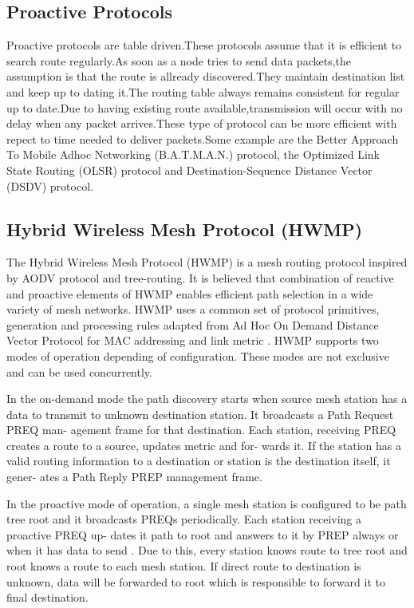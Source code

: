 \documentclass[12pt,a4paper]{report}
\begin{document}
\subsection{Proactive Protocols}
Proactive protocols are table driven.These protocols assume that it is efficient to search route regularly.As soon as a node tries to send data packets,the assumption is that the route is allready discovered.They maintain destination list and keep up to dating it.The routing table always remains consistent for regular up to date.Due to having existing route available,transmission will occur with no delay when any packet arrives.These type of protocol can be more efficient with repect to time needed to deliver packets.Some example are   the Better Approach To Mobile Adhoc Networking (B.A.T.M.A.N.) protocol, the Optimized Link State Routing (OLSR) protocol and Destination-Sequence Distance Vector (DSDV) protocol.


\subsection{Hybrid Wireless Mesh Protocol (HWMP) }
The Hybrid Wireless Mesh Protocol (HWMP) is a mesh
routing protocol inspired by AODV protocol and tree-routing. It is
believed that  combination of reactive and
proactive elements of HWMP enables efficient path selection
in a wide variety of mesh networks. HWMP uses a common
set of protocol primitives, generation and processing rules
adapted from Ad Hoc On Demand Distance Vector Protocol for MAC addressing and link metric . HWMP
supports two modes of operation depending of configuration.
These modes are not exclusive and can be used
concurrently.

In the on-demand mode the path discovery starts when 
source mesh station has a data to transmit to unknown
destination station. It broadcasts a Path Request PREQ man-
agement frame for that destination. Each station, receiving
PREQ creates a route to a source, updates metric and for-
wards it. If the station has a valid routing information to a
destination or station is the destination itself, it gener-
ates a Path Reply PREP management frame.

In the proactive mode of operation, a single mesh station is
configured to be  path tree root and it broadcasts PREQs
periodically. Each station receiving a proactive PREQ up-
dates it path to root and answers to it by PREP always or
when it has data to send .
Due to this, every station knows route to tree root and root
knows a route to each mesh station. If direct route to destination is unknown, data will be forwarded to root which
is responsible to forward it to  final destination.
\end{document}
